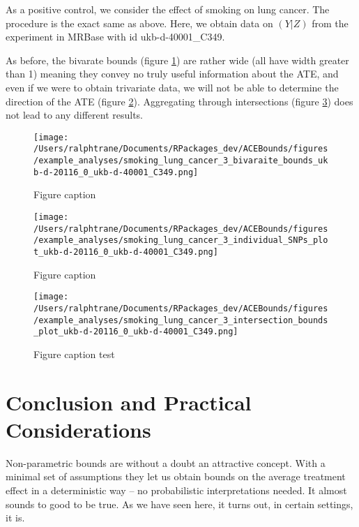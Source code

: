 \documentclass[
]{article}
\theoremstyle{plain}
\begin{document}
As a positive control, we consider the effect of smoking on lung cancer. The procedure is the exact same as above. Here, we obtain data on \((Y|Z)\) from the experiment in MRBase with id ukb-d-40001\_C349.

As before, the bivarate bounds (figure \ref{fig:smoking_on_lung_cancer_ind_bounds}) are rather wide (all have width greater than 1) meaning they convey no truly useful information about the ATE, and even if we were to obtain trivariate data, we will not be able to determine the direction of the ATE (figure \ref{fig:smoking_on_lung_cancer_tri_bounds}). Aggregating through intersections (figure \ref{fig:smoking_on_lung_cancer_intersections}) does not lead to any different results.

\begin{figure}[h]
  \texttt{[image: /Users/ralphtrane/Documents/RPackages\_dev/ACEBounds/figures/example\_analyses/smoking\_lung\_cancer\_3\_bivaraite\_bounds\_ukb-d-20116\_0\_ukb-d-40001\_C349.png]}
  \caption{Figure caption}
  \label{fig:smoking_on_lung_cancer_ind_bounds}
\end{figure}

\begin{figure}[h]
  \texttt{[image: /Users/ralphtrane/Documents/RPackages\_dev/ACEBounds/figures/example\_analyses/smoking\_lung\_cancer\_3\_individual\_SNPs\_plot\_ukb-d-20116\_0\_ukb-d-40001\_C349.png]}
  \caption{Figure caption}
  \label{fig:smoking_on_lung_cancer_tri_bounds}
\end{figure}

\begin{figure}[h]
  \texttt{[image: /Users/ralphtrane/Documents/RPackages\_dev/ACEBounds/figures/example\_analyses/smoking\_lung\_cancer\_3\_intersection\_bounds\_plot\_ukb-d-20116\_0\_ukb-d-40001\_C349.png]}
  \caption{Figure caption test}
  \label{fig:smoking_on_lung_cancer_intersections}
\end{figure}

\newpage

\hypertarget{conclusion-and-practical-considerations}{%
\section{Conclusion and Practical Considerations}\label{conclusion-and-practical-considerations}}

Non-parametric bounds are without a doubt an attractive concept. With a minimal set of assumptions they let us obtain bounds on the average treatment effect in a deterministic way -- no probabilistic interpretations needed. It almost sounds to good to be true. As we have seen here, it turns out, in certain settings, it is.
\end{document}
